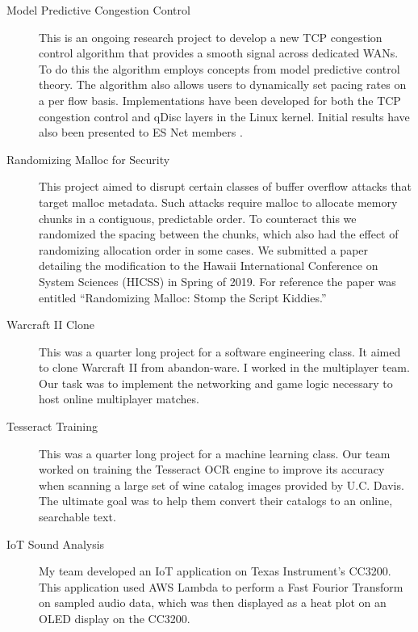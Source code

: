 \documentclass{article}
\begin{document}
\begin{description}
    \item[Model Predictive Congestion Control] This is an ongoing research
        project to develop a new TCP congestion control algorithm that provides
        a smooth signal across dedicated WANs.
        To do this the algorithm employs concepts from model predictive control
        theory.
        The algorithm also allows users to dynamically set pacing rates on a per
        flow basis.
        Implementations have been developed for both the TCP congestion control
        and qDisc layers in the Linux kernel.
        Initial results have also been presented to ES Net members
        .

    \item[Randomizing Malloc for Security] This project aimed to disrupt certain
        classes of buffer overflow attacks that target malloc metadata.
        Such attacks require malloc to allocate memory chunks in a contiguous,
        predictable order.
        To counteract this we randomized the spacing between the chunks, which
        also had the effect of randomizing allocation order in some cases.
        We submitted a paper detailing the modification to the Hawaii
        International Conference on System Sciences (HICSS) in Spring of 2019.
        For reference the paper was entitled ``Randomizing Malloc: Stomp the
        Script Kiddies.''

    \item[Warcraft II Clone] This was a quarter long project for a software
        engineering class.
        It aimed to clone Warcraft II from abandon-ware.
        I worked in the multiplayer team.
        Our task was to implement the networking and game logic necessary to
        host online multiplayer matches.

    \item[Tesseract Training]
        This was a quarter long project for a machine learning class.
        Our team worked on training the Tesseract OCR engine to improve its
        accuracy when scanning a large set of wine catalog images provided by
        U.C.  Davis.
        The ultimate goal was to help them convert their catalogs to an online,
        searchable text.

    \item[IoT Sound Analysis]
        My team developed an IoT application on Texas Instrument's CC3200.
        This application used AWS Lambda to perform a Fast Fourior
        Transform on sampled audio data, which was then displayed as a
        heat plot on an OLED display on the CC3200.
\end{description}
\end{document}
